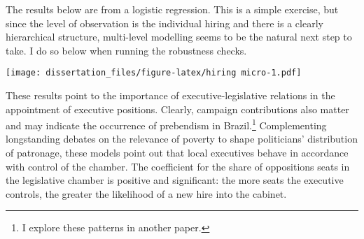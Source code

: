 \documentclass[12pt,]{book}
\newenvironment{Shaded}{\begin{snugshade}}{\end{snugshade}}
\newcommand{\CharTok}[1]{\textcolor[rgb]{0.31,0.60,0.02}{#1}}
\newcommand{\CommentTok}[1]{\textcolor[rgb]{0.56,0.35,0.01}{\textit{#1}}}
\newcommand{\DataTypeTok}[1]{\textcolor[rgb]{0.13,0.29,0.53}{#1}}
\newcommand{\KeywordTok}[1]{\textcolor[rgb]{0.13,0.29,0.53}{\textbf{#1}}}
\newcommand{\NormalTok}[1]{#1}
\newcommand{\OperatorTok}[1]{\textcolor[rgb]{0.81,0.36,0.00}{\textbf{#1}}}
\newcommand{\StringTok}[1]{\textcolor[rgb]{0.31,0.60,0.02}{#1}}
\let\rmarkdownfootnote\footnote%
\def\footnote{\protect\rmarkdownfootnote}
\begin{document}
The results below are from a logistic regression. This is a simple exercise, but since the level of observation is the individual hiring and there is a clearly hierarchical structure, multi-level modelling seems to be the natural next step to take. I do so below when running the robustness checks.

\begin{Shaded}
\end{Shaded}

\texttt{[image: dissertation\_files/figure-latex/hiring micro-1.pdf]}

These results point to the importance of executive-legislative relations in the appointment of executive positions. Clearly, campaign contributions also matter and may indicate the occurrence of prebendism in Brazil.\footnote{I explore these patterns in another paper.} Complementing longstanding debates on the relevance of poverty to shape politicians' distribution of patronage, these models point out that local executives behave in accordance with control of the chamber. The coefficient for the share of oppositions seats in the legislative chamber is positive and significant: the more seats the executive controls, the greater the likelihood of a new hire into the cabinet.
\end{document}
